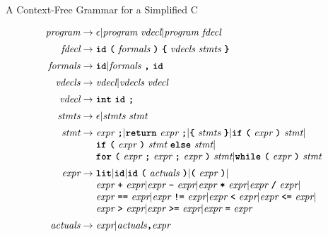 \documentclass{plt}
\begin{document}
\begin{frame}{A Context-Free Grammar for a Simplified C}

\[
\begin{array}{r@{\hspace{3pt}}c@{\hspace{3pt}}l}
\textit{program} & \rightarrow & \epsilon |
   \textit{program}\ \textit{vdecl} |
   \textit{program}\ \textit{fdecl} \\[5pt]
\textit{fdecl} & \rightarrow &
\tok{id}\ \tok{(}\ \textit{formals}\ \tok{)}\ \tok{\{}\ \textit{vdecls}\ \textit{stmts}\ \tok{\}}
\\[5pt]
\textit{formals} & \rightarrow & \tok{id} |
\textit{formals}\ \tok{,}\ \tok{id} \\[5pt]
\textit{vdecls} & \rightarrow & \textit{vdecl} | \textit{vdecls}\ \textit{vdecl} \\[5pt]
\textit{vdecl} & \rightarrow & \tok{int}\ \tok{id}\ \tok{;} \\[5pt]
\textit{stmts} & \rightarrow & \epsilon | \textit{stmts}\ \textit{stmt} \\[5pt]
\textit{stmt} & \rightarrow & \textit{expr}\ \tok{;} |
\tok{return}\ \textit{expr}\ \tok{;} |
\tok{\{}\ \textit{stmts}\ \tok{\}} |
\tok{if}\ \tok{(}\ \textit{expr}\ \tok{)}\ \textit{stmt} | \\&&
\tok{if}\ \tok{(}\ \textit{expr}\ \tok{)}\ \textit{stmt}\ \tok{else}\ \textit{stmt}
| \\&&
\tok{for}\ \tok{(}\ \textit{expr}\ \tok{;}\ \textit{expr}\ \tok{;}\ \textit{expr}\ \tok{)}\ \textit{stmt}
|
\tok{while}\ \tok{(}\ \textit{expr}\ \tok{)}\ \textit{stmt}
\\[5pt]
\textit{expr} & \rightarrow &
\tok{lit} | \tok{id} |
\tok{id}\ \tok{(}\ \textit{actuals}\ \tok{)} |
\tok{(}\ \textit{expr}\ \tok{)} | \\&&
\textit{expr}\ \tok{+}\ \textit{expr} |
\textit{expr}\ \tok{-}\ \textit{expr} |
\textit{expr}\ \tok{*}\ \textit{expr} |
\textit{expr}\ \tok{/}\ \textit{expr} | \\&&
\textit{expr}\ \tok{==}\ \textit{expr} |
\textit{expr}\ \tok{!=}\ \textit{expr} |
\textit{expr}\ \tok{<}\ \textit{expr} |
\textit{expr}\ \tok{<=}\ \textit{expr} |  \\&&
\textit{expr}\ \tok{>}\ \textit{expr} |
\textit{expr}\ \tok{>=}\ \textit{expr} |
\textit{expr}\ \tok{=}\ \textit{expr}
\\[5pt]
\textit{actuals} & \rightarrow & \textit{expr} | \textit{actuals}
\tok{,} \textit{expr} \\
\end{array}
\]

\end{frame}
\end{document}
